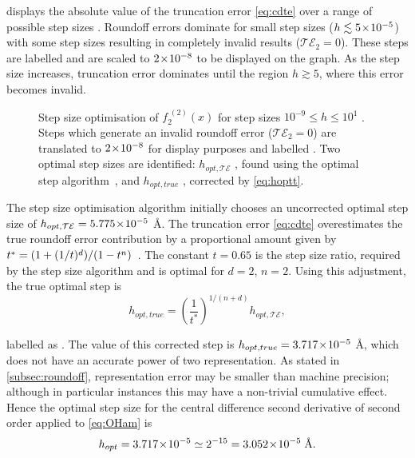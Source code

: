  displays the absolute value of the truncation error \cref{eq:cdte} over a range of possible step sizes .
Roundoff errors dominate for small step sizes ($h \lesssim 5\!\times\!10^{-5}$) with some step sizes resulting in completely invalid results (\ie $\mathcal{TE}_2 = 0$).
These steps are labelled  and are scaled to $2\!\times\!10^{-8}$ to be displayed on the graph.
As the step size increases, truncation error dominates until the region $h \gtrsim 5$, where this error becomes invalid.
\begin{figure}[htp]
\centering
\resizebox{\textwidth}{!}{}
\caption[Step size optimisation of $f_2^{\;(2)}(x)$]{\label{fig:hopt3pt}Step size optimisation of $f_2^{\;(2)}(x)$ for step sizes $10^{-9}\!\leq\! h\! \leq\! 10^1$ . Steps which generate an invalid roundoff error (\ie $\mathcal{TE}_2 = 0$) are translated to $2\!\times\!10^{-8}$ for display purposes and labelled . Two optimal step sizes are identified: $h_{opt,\mathcal{TE}}$ , found using the optimal step algorithm~\cite{Mathur2012}, and $h_{opt,true}$ , corrected by \cref{eq:hoptt}.}
\end{figure}

The step size optimisation algorithm initially chooses an uncorrected optimal step size  of $h_{opt,\mathcal{TE}} = 5.775\!\times\!10^{-5}$ Å.
The truncation error \cref{eq:cdte} overestimates the true roundoff error contribution by a proportional amount given by $\cramped{t^* = (1+(1/t)^d)/(1-t^n)}$~\cite{Mathur2012}.
The constant $t = 0.65$ is the step size ratio, required by the step size algorithm and is optimal for $d=2$, $n=2$.
Using this adjustment, the true optimal step is
\begin{equation}
h_{opt,true} = \left(\frac{1}{t^*}\right)^{1/(n+d)}h_{opt,\mathcal{TE}},\label{eq:hoptt}
\end{equation}

labelled as .
The value of this corrected step is $h_{opt,true} = 3.717\!\times\!10^{-5}$ Å, which does not have an accurate power of two representation.
As stated in \cref{subsec:roundoff}, representation error may be smaller than machine precision; although in particular instances this may have a non-trivial cumulative effect.
Hence the optimal step size for the central difference second derivative of second order applied to \cref{eq:OHam} is
\begin{equation}
h_{opt} = 3.717\!\times\!10^{-5} \simeq 2^{-15} = 3.052\!\times\!10^{-5}\;\text{Å}.
\end{equation}

